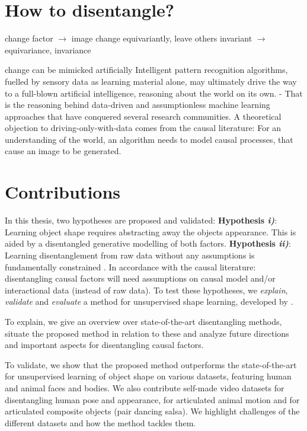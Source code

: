 	\section{How to disentangle?}
	change factor $\rightarrow$  image change equivariantly, leave others invariant
	$\rightarrow$  equivariance, invariance

	change can be mimicked artificially
	Intelligent pattern recognition algorithms, fuelled by sensory data as learning material alone, may ultimately drive the way to a full-blown artificial intelligence, reasoning about the world on its own. - That is the reasoning behind data-driven and assumptionless machine learning approaches that have conquered several research communities.
	A theoretical objection to driving-only-with-data comes from the causal literature: For an understanding of the world, an algorithm needs to model causal processes, that cause an image to be generated.

	\section{Contributions}
	In this thesis, two hypotheses are proposed and validated:
	\textbf{Hypothesis \emph{i)}}: Learning object shape requires abstracting away the objects appearance. This is aided by a disentangled generative modelling of both factors.
	\textbf{Hypothesis \emph{ii)}}: Learning disentanglement from raw data without any assumptions is fundamentally constrained \cite{Pearl:2018im}. In accordance with the causal literature: disentangling causal factors will need assumptions on causal model and/or interactional data (instead of raw data).
	To test these hypotheses, we \textit{explain}, \textit{validate} and \textit{evaluate} a method for unsupervised shape learning, developed by .


	To explain, we give an overview over state-of-the-art disentangling methods, situate the proposed method in relation to these and analyze future directions and important aspects for disentangling causal factors.


	To validate, we show that the proposed method outperforms the state-of-the-art for unsupervised learning of object shape on various datasets, featuring human and animal faces and bodies.
	We also contribute self-made video datasets for disentangling human pose and appearance, for articulated animal motion and for articulated composite objects (pair dancing salsa). We highlight challenges of the different datasets and how the method tackles them.


